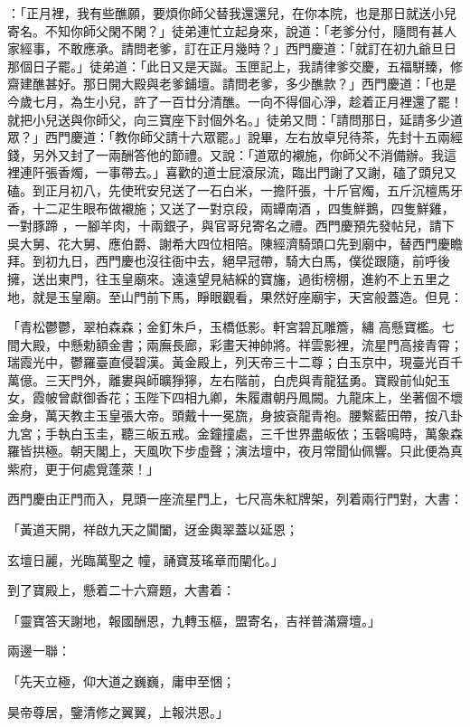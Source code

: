 ：「正月裡，我有些醮願，要煩你師父替我還還兒，在你本院，也是那日就送小兒寄名。不知你師父閑不閑？」徒弟連忙立起身來，說道：「老爹分付，隨問有甚人家經事，不敢應承。請問老爹，訂在正月幾時？」西門慶道：「就訂在初九爺旦日那個日子罷。」徒弟道：「此日又是天誕。玉匣記上，我請律爹交慶，五福駢臻，修齋建醮甚好。那日開大殿與老爹鋪壇。請問老爹，多少醮款？」西門慶道：「也是今歲七月，為生小兒，許了一百廿分清醮。一向不得個心淨，趁着正月裡還了罷！就把小兒送與你師父，向三寶座下討個外名。」徒弟又問：「請問那日，延請多少道眾？」西門慶道：「教你師父請十六眾罷。」說畢，左右放卓兒待茶，先封十五兩經錢，另外又封了一兩酬答他的節禮。又說：「道眾的襯施，你師父不消備辦。我這裡連阡張香燭，一事帶去。」喜歡的道士屁滾尿流，臨出門謝了又謝，磕了頭兒又磕。到正月初八，先使玳安兒送了一石白米，一擔阡張，十斤官燭，五斤沉檀馬牙香，十二疋生眼布做襯施；又送了一對京段，兩罈南酒 ，四隻鮮鵝，四隻鮮雞，一對豚蹄 ，一腳羊肉，十兩銀子，與官哥兒寄名之禮。西門慶預先發帖兒，請下吳大舅、花大舅、應伯爵、謝希大四位相陪。陳經濟騎頭口先到廟中，替西門慶瞻拜。到初九日，西門慶也沒往衙中去，絕早冠帶，騎大白馬，僕從跟隨，前呼後擁，送出東門，往玉皇廟來。遠遠望見結綵的寶旛，過街榜棚，進約不上五里之地，就是玉皇廟。至山門前下馬，睜眼觀看，果然好座廟宇，天宮般蓋造。但見：

「青松鬱鬱，翠柏森森；金釘朱戶，玉橋低影。軒宮碧瓦雕簷，繡 高懸寶檻。七間大殿，中懸勅額金書；兩廡長廊，彩畫天神帥將。祥雲影裡，流星門高接青霄；瑞霞光中，鬱羅臺直侵碧漢。黃金殿上，列天帝三十二尊；白玉京中，現臺光百千萬億。三天門外，離婁與師曠猙獰，左右階前，白虎與青龍猛勇。寶殿前仙妃玉女，霞帔曾獻御香花；玉陛下四相九卿，朱履肅朝丹鳳闕。九龍床上，坐著個不壞金身，萬天教主玉皇張大帝。頭戴十一冕旒，身披袞龍青袍。腰繫藍田帶，按八卦九宮；手執白玉圭，聽三皈五戒。金鐘撞處，三千世界盡皈依；玉磬鳴時，萬象森羅皆拱極。朝天閣上，天風吹下步虛聲；演法壇中，夜月常聞仙佩響。只此便為真紫府，更于何處覓蓬萊！」

西門慶由正門而入，見頭一座流星門上，七尺高朱紅牌架，列着兩行門對，大書：

「黃道天開，祥啟九天之闐闔，迓金輿翠蓋以延恩；

玄壇日麗，光臨萬聖之 幢，誦寶芨瑤章而闡化。」

到了寶殿上，懸着二十六齋題，大書着：

「靈寶答天謝地，報國酬恩，九轉玉樞，盟寄名，吉祥普滿齋壇。」

兩邊一聯：

「先天立極，仰大道之巍巍，庸申至悃；

昊帝尊居，鑒清修之翼翼，上報洪恩。」

